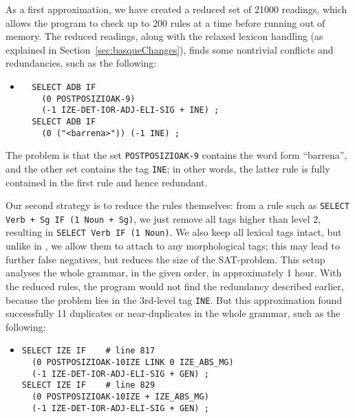 {{As a first approximation, we have created a reduced set of 21000
readings, which allows the program to check up to 200 rules at a time
before running out of memory. The reduced readings, along with the
relaxed lexicon handling (as explained in
Section~\ref{sec:basqueChanges}), finds some nontrivial conflicts and
redundancies, such as the following:

\begin{itemize}
\item[]
\begin{verbatim}
  SELECT ADB IF
    (0 POSTPOSIZIOAK-9) 
    (-1 IZE-DET-IOR-ADJ-ELI-SIG + INE) ;
  SELECT ADB IF  
    (0 ("<barrena>")) (-1 INE) ;
\end{verbatim}
\end{itemize}

\noindent The problem is that the set \texttt{POSTPOSIZIOAK-9}
contains the word form ``barrena'', and the other set contains the tag
\texttt{INE}; in other words, the latter rule is fully contained in
the first rule and hence redundant.


Our second strategy is to reduce the rules themselves: from a rule
such as \texttt{SELECT Verb + Sg IF (1 Noun + Sg)}, we just remove all
tags higher than level 2, resulting in \texttt{SELECT Verb IF (1
  Noun)}. We also keep all lexical tags intact, but unlike in
\cite{listenmaa_claessen2016}, we allow them to attach to any
morphological tags; this may lead to further false negatives, but
reduces the size of the SAT-problem.  This setup analyses the whole
grammar, in the given order, in approximately 1 hour.  With the
reduced rules, the program would not find the redundancy described
earlier, because the problem lies in the 3rd-level tag
\texttt{INE}. But this approximation found successfully 11 duplicates
or near-duplicates in the whole grammar, such as the following:

\begin{itemize}
\item[]
\begin{verbatim}
SELECT IZE IF 	 # line 817
  (0 POSTPOSIZIOAK-10IZE LINK 0 IZE_ABS_MG) 
  (-1 IZE-DET-IOR-ADJ-ELI-SIG + GEN) ; 
SELECT IZE IF 	 # line 829
  (0 POSTPOSIZIOAK-10IZE + IZE_ABS_MG) 
  (-1 IZE-DET-IOR-ADJ-ELI-SIG + GEN) ;
\end{verbatim}
\end{itemize}

}}
